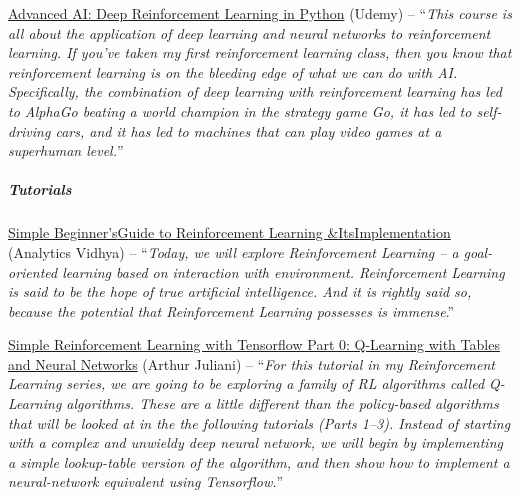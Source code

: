 \documentclass[a4paper, 11pt]{article}
\begin{document}
\href{https://www.udemy.com/deep-reinforcement-learning-in-python/}{Advanced
AI: Deep Reinforcement Learning in Python} (Udemy) -- ``\emph{This
course is all about the application of deep learning and neural networks
to reinforcement learning. If you've taken my first reinforcement
learning class, then you know that reinforcement learning is on the
bleeding edge of what we can do with AI. Specifically, the combination
of deep learning with reinforcement learning has led to AlphaGo beating
a world champion in the strategy game Go, it has led to self-driving
cars, and it has led to machines that can play video games at a
superhuman level.}''

\subparagraph{\textbf{Tutorials}}

\href{https://www.analyticsvidhya.com/blog/2017/01/introduction-to-reinforcement-learning-implementation/}{Simple
Beginner's}\href{https://www.analyticsvidhya.com/blog/2017/01/introduction-to-reinforcement-learning-implementation/}{G}\href{https://www.analyticsvidhya.com/blog/2017/01/introduction-to-reinforcement-learning-implementation/}{uide
to Reinforcement Learning
\&}\href{https://www.analyticsvidhya.com/blog/2017/01/introduction-to-reinforcement-learning-implementation/}{I}\href{https://www.analyticsvidhya.com/blog/2017/01/introduction-to-reinforcement-learning-implementation/}{ts}\href{https://www.analyticsvidhya.com/blog/2017/01/introduction-to-reinforcement-learning-implementation/}{I}\href{https://www.analyticsvidhya.com/blog/2017/01/introduction-to-reinforcement-learning-implementation/}{mplementation}
(Analytics Vidhya) -- ``\emph{Today, we will explore Reinforcement
Learning -- a goal-oriented learning based on interaction with
environment. Reinforcement Learning is said to be the hope of true
artificial intelligence. And it is rightly said so, because the
potential that Reinforcement Learning possesses is immense}.''

\href{https://medium.com/emergent-future/simple-reinforcement-learning-with-tensorflow-part-0-q-learning-with-tables-and-neural-networks-d195264329d0}{Simple
Reinforcement Learning with Tensorflow Part 0: Q-Learning with Tables
and Neural Networks} (Arthur Juliani) -- ``\emph{For this tutorial in my
Reinforcement Learning series, we are going to be exploring a family of
RL algorithms called Q-Learning algorithms. These are a little different
than the policy-based algorithms that will be looked at in the the
following tutorials (Parts 1--3). Instead of starting with a complex and
unwieldy deep neural network, we will begin by implementing a simple
lookup-table version of the algorithm, and then show how to implement a
neural-network equivalent using Tensorflow.}''
\end{document}
